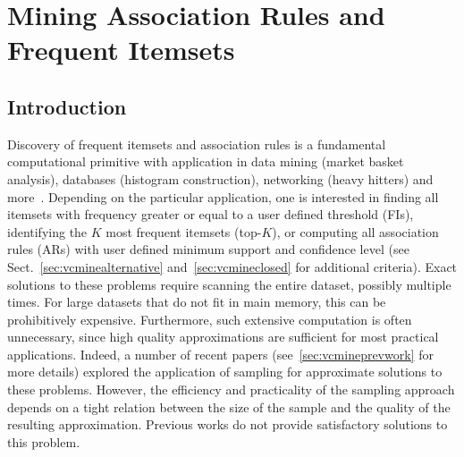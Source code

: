 \chapter[Mining Association Rules and Frequent Itemsets]{Mining Association
Rules and Frequent Itemsets\protect{}}\label{ch:vcmine}

\section{Introduction}\label{sec:vcmineintro}
Discovery of frequent itemsets and association rules is a fundamental
computational primitive with application in data mining (market basket
analysis), databases (histogram construction), networking (heavy hitters) and
more~\cite[Sect.~5]{HanCXY07}. Depending on the particular application, one is
interested in finding all itemsets with frequency greater or equal to a user
defined threshold (FIs), identifying the $K$ most frequent itemsets (top-$K$),
or computing all association rules (ARs) with user defined minimum  support and
confidence level (see Sect.~\ref{sec:vcminealternative} and~\ref{sec:vcmineclosed} for additional criteria). Exact solutions to these problems require scanning the entire
dataset, possibly multiple times. For large datasets that do not fit in main
memory, this can be prohibitively expensive. Furthermore, such extensive
computation is often unnecessary, since high quality approximations are
sufficient for most practical applications.  Indeed, a number of recent
papers (see~\ref{sec:vcmineprevwork} for more details)
explored the application of sampling for approximate solutions to these
problems. However, the efficiency and practicality of the sampling approach
depends on a tight relation between the size of the sample and the quality of
the resulting approximation. Previous works do not provide satisfactory
solutions to this problem.

